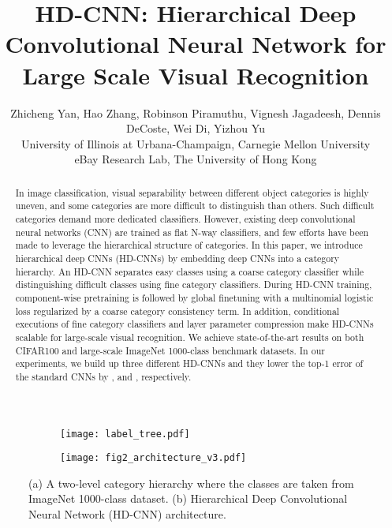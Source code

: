 \documentclass[10pt,twocolumn,letterpaper]{article}
\begin{document}
\title{HD-CNN: Hierarchical Deep Convolutional Neural Network for Large Scale
Visual Recognition}

\author{Zhicheng Yan,
Hao Zhang,
Robinson Piramuthu,
Vignesh Jagadeesh,
Dennis DeCoste,
Wei Di,
Yizhou Yu\\
University of Illinois at Urbana-Champaign,
Carnegie Mellon University\\
eBay Research Lab,
The University of Hong Kong
}

\maketitle


\setlength{\textfloatsep}{1em}

\begin{abstract}

In image classification, visual separability between different object categories is highly uneven, and some categories are more difficult to distinguish than others. Such difficult categories demand more dedicated classifiers. However, existing deep convolutional neural networks (CNN) are trained as flat N-way classifiers, and few efforts have been made to leverage the hierarchical structure of categories. In this paper, we introduce hierarchical deep CNNs (HD-CNNs) by embedding deep CNNs into a category hierarchy. An HD-CNN separates easy classes using a coarse category classifier while distinguishing difficult classes using fine category classifiers. During HD-CNN training, component-wise pretraining is followed by global finetuning with a multinomial logistic loss regularized by a coarse category consistency term. In addition, conditional executions of fine category classifiers  and layer parameter compression make HD-CNNs scalable for large-scale visual recognition. We achieve state-of-the-art results on both CIFAR100 and large-scale ImageNet 1000-class benchmark datasets. In our experiments, we build up three different HD-CNNs and they lower the top-1 error of the standard CNNs by ,  and , respectively. 

\end{abstract}

\begin{figure*}[ht]
\centering
\begin{subfigure}{.22\textwidth}
  \centering
  \texttt{[image: label\_tree.pdf]}
  \caption{}
\end{subfigure}\begin{subfigure}{.72\textwidth}
  \centering
  \texttt{[image: fig2\_architecture\_v3.pdf]}
  \caption{}
\end{subfigure}
\vspace{-2em}
\caption{(a) A two-level category hierarchy where the classes are taken from ImageNet 1000-class dataset. (b) Hierarchical Deep Convolutional Neural Network (HD-CNN) architecture.}
\label{fig:architecture}
\vspace{-2em}
\end{figure*}
\end{document}

